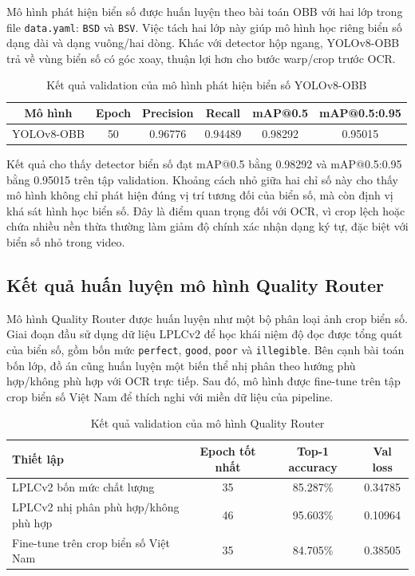 \documentclass[../DoAn.tex]{subfiles}
\begin{document}
Mô hình phát hiện biển số được huấn luyện theo bài toán OBB với hai lớp trong file \texttt{data.yaml}: \texttt{BSD} và \texttt{BSV}. Việc tách hai lớp này giúp mô hình học riêng biển số dạng dài và dạng vuông/hai dòng. Khác với detector hộp ngang, YOLOv8-OBB trả về vùng biển số có góc xoay, thuận lợi hơn cho bước warp/crop trước OCR.

\begin{table}[htbp]
\centering
\caption{Kết quả validation của mô hình phát hiện biển số YOLOv8-OBB}
\label{tab:plate-detector-result}
\begin{tabular}{|c|c|c|c|c|c|}
\hline
\textbf{Mô hình} & \textbf{Epoch} & \textbf{Precision} & \textbf{Recall} & \textbf{mAP@0.5} & \textbf{mAP@0.5:0.95} \\
\hline
YOLOv8-OBB & 50 & 0.96776 & 0.94489 & 0.98292 & 0.95015 \\
\hline
\end{tabular}
\end{table}

Kết quả cho thấy detector biển số đạt mAP@0.5 bằng 0.98292 và mAP@0.5:0.95 bằng 0.95015 trên tập validation. Khoảng cách nhỏ giữa hai chỉ số này cho thấy mô hình không chỉ phát hiện đúng vị trí tương đối của biển số, mà còn định vị khá sát hình học biển số. Đây là điểm quan trọng đối với OCR, vì crop lệch hoặc chứa nhiều nền thừa thường làm giảm độ chính xác nhận dạng ký tự, đặc biệt với biển số nhỏ trong video.

\subsection{Kết quả huấn luyện mô hình Quality Router}
\label{subsection:5.2.3}

Mô hình Quality Router được huấn luyện như một bộ phân loại ảnh crop biển số. Giai đoạn đầu sử dụng dữ liệu LPLCv2 để học khái niệm độ đọc được tổng quát của biển số, gồm bốn mức \texttt{perfect}, \texttt{good}, \texttt{poor} và \texttt{illegible}. Bên cạnh bài toán bốn lớp, đồ án cũng huấn luyện một biến thể nhị phân theo hướng phù hợp/không phù hợp với OCR trực tiếp. Sau đó, mô hình được fine-tune trên tập crop biển số Việt Nam để thích nghi với miền dữ liệu của pipeline.

\begin{table}[htbp]
\centering
\caption{Kết quả validation của mô hình Quality Router}
\label{tab:quality-router-result}
\begin{tabular}{|l|c|c|c|}
\hline
\textbf{Thiết lập} & \textbf{Epoch tốt nhất} & \textbf{Top-1 accuracy} & \textbf{Val loss} \\
\hline
LPLCv2 bốn mức chất lượng & 35 & 85.287\% & 0.34785 \\
\hline
LPLCv2 nhị phân phù hợp/không phù hợp & 46 & 95.603\% & 0.10964 \\
\hline
Fine-tune trên crop biển số Việt Nam & 35 & 84.705\% & 0.38505 \\
\hline
\end{tabular}
\end{table}
\end{document}

